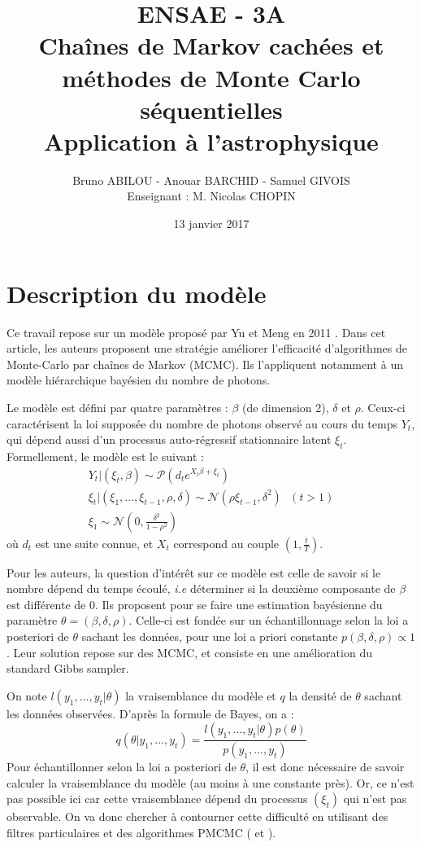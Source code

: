\documentclass{article}
\title{ENSAE - 3A
\\ Chaînes de Markov cachées et méthodes de Monte Carlo séquentielles
\\ Application à l'astrophysique}
\author{Bruno ABILOU - Anouar BARCHID - Samuel GIVOIS 
    \\ Enseignant : M. Nicolas CHOPIN}
\date{13 janvier 2017}
\begin{document}
\maketitle

\section{Description du modèle}

Ce travail repose sur un modèle proposé par Yu et Meng en 2011 \cite{yu2011center}. Dans cet article, les auteurs proposent une stratégie améliorer l'efficacité d'algorithmes de Monte-Carlo par chaînes de Markov (MCMC). Ils l'appliquent notamment à un modèle hiérarchique bayésien du nombre de photons.

Le modèle est défini par quatre paramètres : $\beta$ (de dimension 2), $\delta$ et $\rho$. Ceux-ci caractérisent la loi supposée du nombre de photons observé au cours du temps $Y_t$, qui dépend aussi d'un processus auto-régressif stationnaire latent $\xi_t$. Formellement, le modèle est le suivant :
\[
\begin{array}{c}
Y_t | (\xi_t, \beta) \sim \mathcal{P}(d_t e^{X_t \beta + \xi_t}) \\
\xi_t | (\xi_1, ..., \xi_{t-1}, \rho, \delta) \sim \mathcal{N}(\rho\xi_{t-1}, \delta^2) \ \ \ (t>1) \\
\xi_1 \sim \mathcal{N}(0, \frac{\delta^2}{1-\rho^2})
\end{array}
\]
où $d_t$ est une suite connue, et $X_t$ correspond au couple $(1, \frac{t}{T})$.

Pour les auteurs, la question d'intérêt sur ce modèle est celle de savoir si le nombre dépend du temps écoulé, \textit{i.e} déterminer si la deuxième composante de $\beta$ est différente de $0$. Ils proposent pour se faire une estimation bayésienne du paramètre $\theta = (\beta, \delta, \rho)$. Celle-ci est fondée sur un échantillonnage selon la loi a posteriori de $\theta$ sachant les données, pour une loi a priori constante $p(\beta, \delta, \rho) \propto 1$. Leur solution repose sur des MCMC, et consiste en une amélioration du \og standard Gibbs sampler\fg. 

On note $l(y_1, ..., y_t | \theta)$ la vraisemblance du modèle et $q$ la densité de $\theta$ sachant les données observées. D'après la formule de Bayes, on a :
\[
q(\theta | y_1, ..., y_t) = \frac{l(y_1, ..., y_t | \theta)p(\theta)}{p(y_1, ..., y_t)}
\]
Pour échantillonner selon la loi a posteriori de $\theta$, il est donc nécessaire de savoir calculer la vraisemblance du modèle (au moins à une constante près). Or, ce n'est pas possible ici car cette vraisemblance dépend du processus $(\xi_t)$ qui n'est pas observable. On va donc chercher à contourner cette difficulté en utilisant des filtres particulaires et des algorithmes PMCMC (\cite{andrieu2010particle} et \cite{holenstein2009particle}).

\renewcommand\bibname{Références}
\nocite{*}


\end{document}
